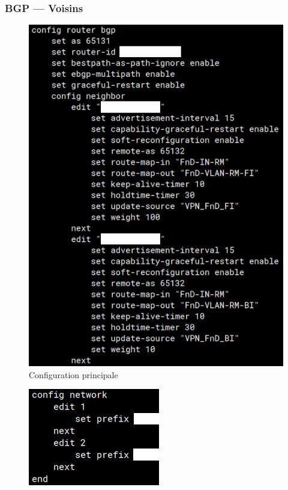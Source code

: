 \documentclass[french, a4paper]{beamer}
\begin{document}
\begin{frame}
    \frametitle{BGP --- Voisins}
    \begin{minipage}{0.6\textwidth}
        \begin{figure}[h!]
            \centering
            \includegraphics[height = 0.85\textheight]
                {img/fgt-auxr/bgp-neighbors.png}
            \caption{Configuration principale}%
            \label{fig:fgt-auxr/bgp-neighbors}
        \end{figure}
    \end{minipage}%
    \hfill
    \begin{minipage}{0.3\textwidth}
        \begin{figure}[h!]
            \centering
            \includegraphics[width = \linewidth]{img/fgt-auxr/bgp-nets.png}

\end{figure}
\end{minipage}
\end{frame}
\end{document}
